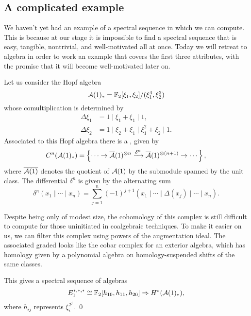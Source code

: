 \begin{subappendices}
\section{A complicated example}\label{ComplicatedExampleSec}

We haven't yet had an example of a spectral sequence in which we can compute.
This is because at our stage it is impossible to find a spectral sequence that is easy, tangible, nontrivial, and well-motivated all at once.
Today we will retreat to algebra in order to work an example that covers the first three attributes, with the promise that it will become well-motivated later on.

Let us consider the Hopf algebra \[\mathcal A(1)_* = \mathbb F_2[\xi_1, \xi_2] / (\xi_1^4, \xi_2^2)\] whose comultiplication is determined by%
\begin{align*}
\Delta \xi_1 & = 1 \mid \xi_1 + \xi_1 \mid 1, \\
\Delta \xi_2 & = 1 \mid \xi_2 + \xi_1 \mid \xi_1^2 + \xi_2 \mid 1.
\end{align*}
Associated to this Hopf algebra there is a , given by \[C^n(\mathcal A(1)_*) = \left\{\cdots \to \overline {\mathcal A}(1)^{\otimes n} \xrightarrow{\delta^n} \overline {\mathcal A}(1)^{\otimes (n+1)} \to \cdots \right\},\] where $\overline{\mathcal A(1)}$ denotes the quotient of $\mathcal A(1)$ by the submodule spanned by the unit class.
The differential $\delta^n$ is given by the alternating sum \[\delta^n(x_1 \mid \cdots \mid x_n) = \sum_{j=1}^n (-1)^{j+1} \left(x_1 \mid \cdots \mid \Delta(x_j) \mid \cdots \mid x_n\right).\]

Despite being only of modest size, the cohomology of this complex is still difficult to compute for those uninitiated in coalgebraic techniques.
To make it easier on us, we can filter this complex using powers of the augmentation ideal.
The associated graded looks like the cobar complex for an exterior algebra, which has homology given by a polynomial algebra on homology-suspended shifts of the same classes.

\begin{theorem}[May]
This gives a spectral sequence of algebras \[E_1^{*, *, *} \cong \mathbb F_2[h_{10}, h_{11}, h_{20}] \Rightarrow H^*(\mathcal A(1)_*),\] where $h_{ij}$ represents $\xi_i^{2^j}$. \qed
\end{theorem}


\end{subappendices}
